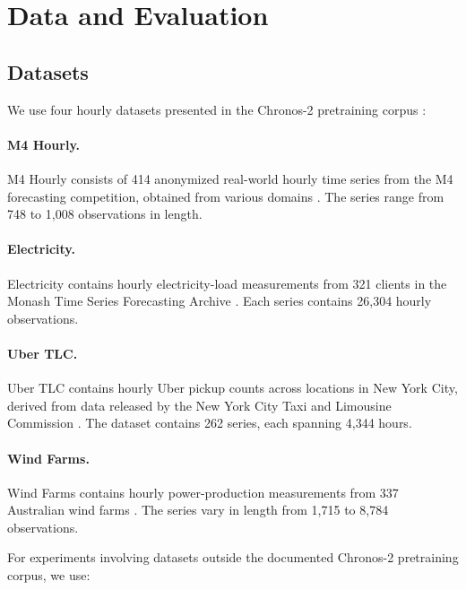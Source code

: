 \documentclass{article}
\begin{document}
\section{Data and Evaluation}

\subsection{Datasets}
\label{apndx:datasets}

We use four hourly datasets presented in the Chronos-2 pretraining corpus
\citep{ansari2025chronos2univariateuniversalforecasting}:

\paragraph{M4 Hourly.}
M4 Hourly consists of 414 anonymized real-world hourly time series from the M4 forecasting competition, obtained from various domains \citep{MAKRIDAKIS202054}. The series range from 748 to 1,008 observations in length.

\paragraph{Electricity.}
Electricity contains hourly electricity-load measurements from 321 clients in the Monash Time Series Forecasting Archive \citep{godahewa2021monashtimeseriesforecasting}. Each series contains 26,304 hourly observations.

\paragraph{Uber TLC.}
Uber TLC contains hourly Uber pickup counts across locations in New York City, derived from data released by the New York City Taxi and Limousine Commission \citep{fivethirtyeight_uber_tlc}. The dataset contains 262 series, each spanning 4,344 hours.

\paragraph{Wind Farms.}
Wind Farms contains hourly power-production measurements from 337 Australian wind farms \citep{godahewa2021monashtimeseriesforecasting}. The series vary in length from 1,715 to 8,784 observations. 

For experiments involving datasets outside the documented Chronos-2 pretraining corpus, we use:
\end{document}
